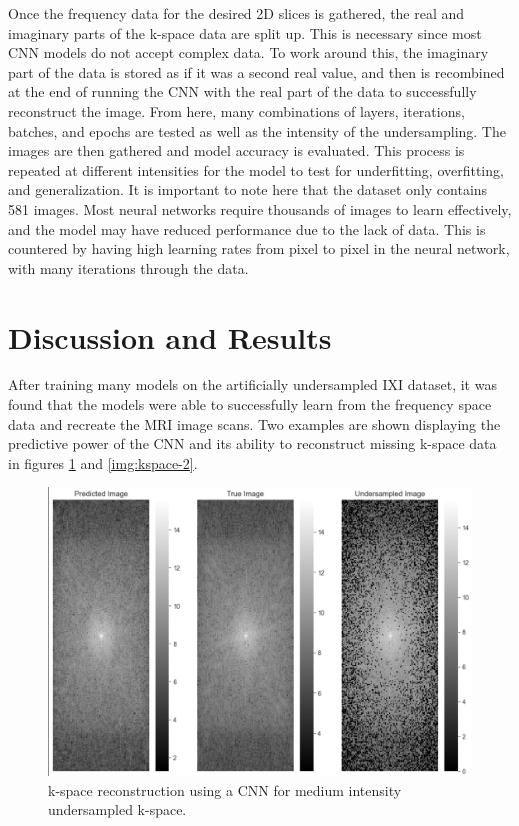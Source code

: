 \documentclass[14pt]{extreport}
\begin{document}
        Once the frequency data for the desired 2D slices is gathered, the real and imaginary parts of the k-space data are split up. This is necessary since most CNN models do not accept complex data. To work around this, the imaginary part of the data is stored as if it was a second real value, and then is recombined at the end of running the CNN with the real part of the data to successfully reconstruct the image. From here, many combinations of layers, iterations, batches, and epochs are tested as well as the intensity of the undersampling. The images are then gathered and model accuracy is evaluated. This process is repeated at different intensities for the model to test for underfitting, overfitting, and generalization. It is important to note here that the dataset only contains 581 images. Most neural networks require thousands of images to learn effectively, and the model may have reduced performance due to the lack of data. This is countered by having high learning rates from pixel to pixel in the neural network, with many iterations through the data.

    \section*{Discussion and Results}
        After training many models on the artificially undersampled IXI dataset, it was found that the models were able to successfully learn from the frequency space data and recreate the MRI image scans. Two examples are shown displaying the predictive power of the CNN and its ability to reconstruct missing k-space data in figures \ref{img:kspace-1} and \ref{img:kspace-2}.

        \begin{figure}[h]
            \centering
            \includegraphics[width=0.75\linewidth]{CNN_1_kspace.png}
            \caption{k-space reconstruction using a CNN for medium intensity undersampled k-space.}
            \label{img:kspace-1}
        \end{figure}
\end{document}
